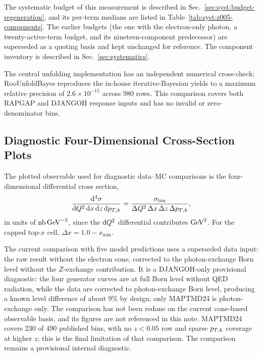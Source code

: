 The systematic budget of this measurement is described in
Sec.~\ref{sec:syst:budget-regeneration}, and its per-term medians are listed in
Table~\ref{tab:syst:z005-components}.  The earlier budgets (the one with the
electron-only photon, a twenty-active-term budget, and its
nineteen-component predecessor) are superseded as a quoting basis and
kept unchanged for reference.  The component inventory is described in
Sec.~\ref{sec:systematics}.

The central unfolding implementation has an independent numerical cross-check:
RooUnfoldBayes reproduces the in-house iterative-Bayesian yields to a maximum
relative precision of $2.6\times10^{-15}$ across 980 rows.  This comparison
covers both RAPGAP and DJANGOH response inputs and has no invalid or
zero-denominator bins.

\subsection{Diagnostic Four-Dimensional Cross-Section Plots}
\label{sec:results:diagnostic-4d-cross-sections}

The plotted observable used for diagnostic data--MC comparisons is the
four-dimensional differential cross section,
\begin{equation}
  \frac{\mathrm{d}^{4}\sigma}{\mathrm{d}Q^{2}\,\mathrm{d}x\,
  \mathrm{d}z\,\mathrm{d}p_{T,h}}
  = \frac{\sigma_{\mathrm{bin}}}{\Delta Q^{2}\,\Delta x\,\Delta z\,\Delta p_{T,h}},
  \label{eq:results:four-dimensional-cross-section-density}
\end{equation}
in units of $\mathrm{nb}\,\text{GeV}^{-3}$, since the $\mathrm{d}Q^{2}$ differential
contributes $\text{GeV}^{2}$. For the capped top-$x$ cell, $\Delta x=1.0-x_{\min}$.

The current comparison with five model predictions uses a superseded data input:
the raw result without the electron cone,
corrected to the photon-exchange Born level without the $Z$-exchange contribution.  It is a DJANGOH-only provisional diagnostic: the
four generator curves are at full Born level without QED radiation, while the data are
corrected to photon-exchange Born level, producing a known level difference of about $9\%$ by design;
only MAPTMD24 is photon-exchange only.  The comparison has not been redone on the
current cone-based observable basis, and its figures are not referenced in this
note.  MAPTMD24 covers 230 of 490 published bins, with no $z<0.05$ row and
sparse $p_{T,h}$ coverage at higher $z$; this is the final limitation of that
comparison.  The comparison remains a provisional internal diagnostic.

